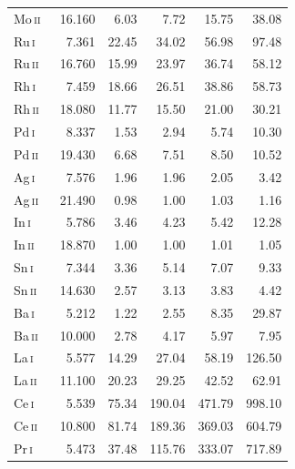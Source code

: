 \documentclass[traditabstract]{aa}
\newcommand{\altmoii}{Mo\,\textsc{ii}}
\newcommand{\altrui}{Ru\,\textsc{i}}
\newcommand{\altruii}{Ru\,\textsc{ii}}
\newcommand{\altrhi}{Rh\,\textsc{i}}
\newcommand{\altrhii}{Rh\,\textsc{ii}}
\newcommand{\altpdi}{Pd\,\textsc{i}}
\newcommand{\altpdii}{Pd\,\textsc{ii}}
\newcommand{\altagi}{Ag\,\textsc{i}}
\newcommand{\altagii}{Ag\,\textsc{ii}}
\newcommand{\altsni}{Sn\,\textsc{i}}
\newcommand{\altsnii}{Sn\,\textsc{ii}}
\newcommand{\altbai}{Ba\,\textsc{i}}
\newcommand{\altbaii}{Ba\,\textsc{ii}}
\newcommand{\altini}{In\,\textsc{i}}
\newcommand{\altinii}{In\,\textsc{ii}}
\newcommand{\altlai}{La\,\textsc{i}}
\newcommand{\altlaii}{La\,\textsc{ii}}
\newcommand{\altcei}{Ce\,\textsc{i}}
\newcommand{\altceii}{Ce\,\textsc{ii}}
\newcommand{\altpri}{Pr\,\textsc{i}}
\newcommand{\moii}{\altmoii\ }
\newcommand{\rui}{\altrui\ }
\newcommand{\ruii}{\altruii\ }
\newcommand{\rhi}{\altrhi\ }
\newcommand{\rhii}{\altrhii\ }
\newcommand{\pdi}{\altpdi\ }
\newcommand{\pdii}{\altpdii\ }
\newcommand{\agi}{\altagi\ }
\newcommand{\agii}{\altagii\ }
\newcommand{\sni}{\altsni\ }
\newcommand{\snii}{\altsnii\ }
\newcommand{\bai}{\altbai\ }
\newcommand{\baii}{\altbaii\ }
\newcommand{\ini}{\altini\ }
\newcommand{\inii}{\altinii\ }
\newcommand{\lai}{\altlai\ }
\newcommand{\laii}{\altlaii\ }
\newcommand{\cei}{\altcei\ }
\newcommand{\ceii}{\altceii\ }
\newcommand{\pri}{\altpri\ }
\begin{document}
\begin{table}
\begin{minipage}{\columnwidth}
\begin{tabular}{l r r r r r}
  \moii &  16.160 &      6.03 &      7.72 &     15.75 &     38.08 \\
  \rui  &   7.361 &     22.45 &     34.02 &     56.98 &     97.48 \\
  \ruii &  16.760 &     15.99 &     23.97 &     36.74 &     58.12 \\
  \rhi  &   7.459 &     18.66 &     26.51 &     38.86 &     58.73 \\
  \rhii &  18.080 &     11.77 &     15.50 &     21.00 &     30.21 \\
  \pdi  &   8.337 &      1.53 &      2.94 &      5.74 &     10.30 \\
  \pdii &  19.430 &      6.68 &      7.51 &      8.50 &     10.52 \\
  \agi  &   7.576 &      1.96 &      1.96 &      2.05 &      3.42 \\
  \agii &  21.490 &      0.98 &      1.00 &      1.03 &      1.16 \\
  \ini  &   5.786 &      3.46 &      4.23 &      5.42 &     12.28 \\
  \inii &  18.870 &      1.00 &      1.00 &      1.01 &      1.05 \\
  \sni  &   7.344 &      3.36 &      5.14 &      7.07 &      9.33 \\
  \snii &  14.630 &      2.57 &      3.13 &      3.83 &      4.42 \\
  \bai  &   5.212 &      1.22 &      2.55 &      8.35 &     29.87 \\
  \baii &  10.000 &      2.78 &      4.17 &      5.97 &      7.95 \\
  \lai  &   5.577 &     14.29 &     27.04 &     58.19 &    126.50 \\
  \laii &  11.100 &     20.23 &     29.25 &     42.52 &     62.91 \\
  \cei  &   5.539 &     75.34 &    190.04 &    471.79 &    998.10 \\
  \ceii &  10.800 &     81.74 &    189.36 &    369.03 &    604.79 \\
  \pri  &   5.473 &     37.48 &    115.76 &    333.07 &    717.89 \\
\hline
\end{tabular}
\end{minipage}%
\begin{minipage}{\columnsep}
\hspace{0pt}
\end{minipage}
\begin{minipage}{\columnwidth}
\centering
\begin{tabular}{l r r r r r}

\end{tabular}
\end{minipage}
\end{table}
\end{document}
